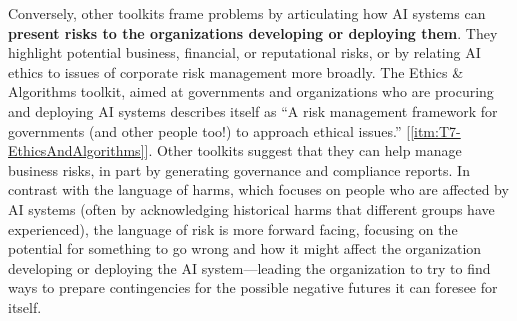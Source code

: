 \documentclass[acmsmall]{acmart}
\begin{document}
Conversely, other toolkits frame problems by articulating how AI systems can \textbf{present risks to the organizations developing or deploying them}. They highlight potential business, financial, or reputational risks, or by relating AI ethics to issues of corporate risk management more broadly. The Ethics \& Algorithms toolkit, aimed at governments and organizations who are procuring and deploying AI systems describes itself as ``A risk management framework for governments (and other people too!) to approach ethical issues.'' [\ref{itm:T7-EthicsAndAlgorithms}]. Other toolkits suggest that they can help manage business risks, in part by generating governance and compliance reports.  
In contrast with the language of harms, which focuses on people who are affected by AI systems (often by acknowledging historical harms that different groups have experienced), the language of risk is more forward facing, focusing on the potential for something to go wrong and how it might affect the organization developing or deploying the AI system---leading the organization to try to find ways to prepare contingencies for the possible negative futures it can foresee for itself. 
\end{document}
